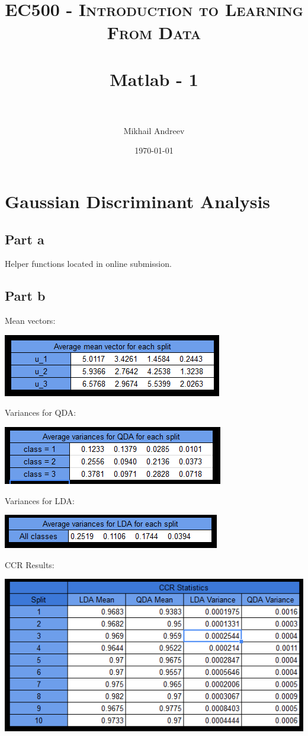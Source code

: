 \documentclass[paper=a4, fontsize=11pt]{scrartcl} %
\title{	
	\normalfont \normalsize 
	\textsc{EC500 - Introduction to Learning From Data} \\ [25pt] %
	\horrule{0.5pt} \\[0.4cm] %
	\huge Matlab - 1 \\ %
	\horrule{2pt} \\[0.5cm] %
}
\author{Mikhail Andreev} %
\date{\normalsize\today} %
\numberwithin{equation}{section} %
\numberwithin{figure}{section} %
\numberwithin{table}{section} %
\begin{document}
	
	\maketitle %
	
	
	\section{Gaussian Discriminant Analysis}
	
	\subsection{Part a}
	Helper functions located in online submission.
	
	\subsection{Part b}
	
	Mean vectors:
	
	\includegraphics{1b_mean_vectors}
	
	Variances for QDA:
	
	\includegraphics{QDA_variances}
	
	Variances for LDA:
	
	\includegraphics{LDA_variances}
	
	CCR Results:
	
	\includegraphics{CCR_Stats}
	
\end{document}
